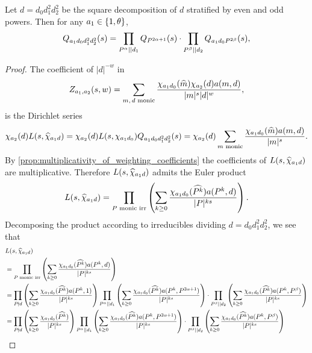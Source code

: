 \documentclass[12pt,reqno,oneside]{amsart}
\begin{document}
    \begin{theorem}\label{thm:correction_polynomial_Euler_product}
        Let $d = d_{0}d_{1}^{2}d_{2}^{2}$ be the square decomposition of $d$ stratified by even and odd powers. Then for any $a_{1} \in \{1,\theta\}$,
        \[
            Q_{a_{1}d_{0}d_{1}^{2}d_{2}^{2}}(s) = \prod_{P^{\alpha} \mid\mid d_{1}}Q_{P^{2\alpha+1}}(s) \cdot \prod_{P^{\beta} \mid\mid d_{2}}Q_{a_{1}d_{0}P^{2\beta}}(s),
        \]
    \end{theorem}
    \begin{proof}
        The coefficient of $|d|^{-w}$ in
        \[
            Z_{a_{1},a_{2}}(s,w) = \sum_{\text{$m,d$ monic}}\frac{\chi_{a_{1}d_{0}}(\widehat{m})\chi_{a_{2}}(d)a(m,d)}{|m|^{s}|d|^{w}},
        \]
        is the Dirichlet series
        \[
            \chi_{a_{2}}(d)L(s,\widehat{\chi}_{a_{1}d}) = \chi_{a_{2}}(d)L(s,\chi_{a_{1}d_{0}})Q_{a_{1}d_{0}d_{1}^{2}d_{2}^{2}}(s) = \chi_{a_{2}}(d)\sum_{\text{$m$ monic}}\frac{\chi_{a_{1}d_{0}}(\widehat{m})a(m,d)}{|m|^{s}}.
        \]
        By \cref{prop:multiplicativity_of_weighting_coefficients} the coefficients of $L(s,\widehat{\chi}_{a_{1}d})$ are multiplicative. Therefore $L(s,\widehat{\chi}_{a_{1}d})$ admits the Euler product
        \[
            L(s,\widehat{\chi}_{a_{1}d}) = \prod_{\text{$P$ monic irr}}\left(\sum_{k \ge 0}\frac{\chi_{a_{1}d_{0}}(\widehat{P^{k}})a(P^{k},d)}{|P|^{ks}}\right).
        \]
        Decomposing the product according to irreducibles dividing $d = d_{0}d_{1}^{2}d_{2}^{2}$, we see that
        \begin{align*}
            & L(s,\what{\chi}_{a_{1}d}) \\
            &= \prod_{\text{$P$ monic irr}}\left(\sum_{k \ge 0}\frac{\chi_{a_{1}d_{0}}(\what{P^{k}})a(P^{k},d)}{|P|^{ks}}\right) \\
            &= \prod_{P \nmid d}\left(\sum_{k \ge 0}\frac{\chi_{a_{1}d_{0}}(\what{P^{k}})a(P^{k},1)}{|P|^{ks}}\right)\prod_{P^{\a} \mid\mid d_{1}}\left(\sum_{k \ge 0}\frac{\chi_{a_{1}d_{0}}(\what{P^{k}})a(P^{k},P^{2\a+1})}{|P|^{ks}}\right) \cdot \prod_{P^{\b} \mid\mid d_{2}}\left(\sum_{k \ge 0}\frac{\chi_{a_{1}d_{0}}(\what{P^{k}})a(P^{k},P^{\b})}{|P|^{ks}}\right) \\
            &= \prod_{P \nmid d}\left(\sum_{k \ge 0}\frac{\chi_{a_{1}d_{0}}(\what{P^{k}})}{|P|^{ks}}\right)\prod_{P^{\a} \mid\mid d_{1}}\left(\sum_{k \ge 0}\frac{\chi_{a_{1}d_{0}}(\what{P^{k}})a(P^{k},P^{2\a+1})}{|P|^{ks}}\right) \cdot \prod_{P^{\b} \mid\mid d_{2}}\left(\sum_{k \ge 0}\frac{\chi_{a_{1}d_{0}}(\what{P^{k}})a(P^{k},P^{\b})}{|P|^{ks}}\right) \\

\end{align*}
\end{proof}
\end{document}
